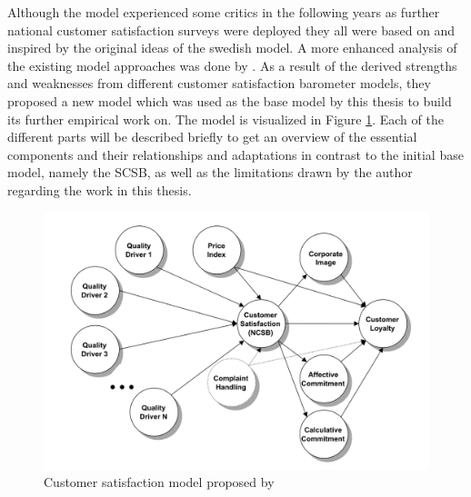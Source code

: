 Although the model experienced some critics in the following years as further national customer satisfaction surveys were deployed they all were based on and inspired by the original ideas of the swedish model. A more enhanced analysis of the existing model approaches was done by \cite{johnson2001evolution}. As a result of the derived strengths and weaknesses from different customer satisfaction barometer models, they proposed a new model which was used as the base model by this thesis to build its further empirical work on. The model is visualized in Figure \ref{fig:satisfactionModel}. Each of the different parts will be described briefly to get an overview of the essential components and their relationships and adaptations in contrast to the initial base model, namely the SCSB, as well as the limitations drawn by the author regarding the work in this thesis. 

\begin{figure}
	\centering
	\includegraphics[width=1.0\textwidth]{img/custSatisfaction.png}
	\caption{Customer satisfaction model proposed by \cite{johnson2001evolution}}
	\label{fig:satisfactionModel}
\end{figure} 

